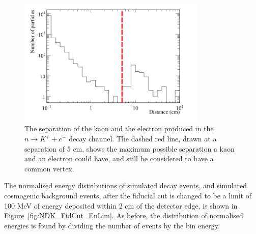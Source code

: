 \begin{figure}[h!]
  \centering
  \includegraphics[width=0.8\textwidth]{NucleonDecay_KaonElecSep}
  \caption[The separation of the kaon and the electron produced in the $n \rightarrow K^{+} + e^{-}$ decay channel]
          {The separation of the kaon and the electron produced in the $n \rightarrow K^{+} + e^{-}$ decay channel. The dashed red line, drawn at a separation of 5 cm, shows the maximum possible separation a kaon and an electron could have, and still be considered to have a common vertex.}
  \label{fig:NDK_Sig_KEDist}
\end{figure}

The normalised energy distributions of simulated decay events, and simulated cosmogenic background events, after the fiducial cut is changed to be a limit of 100 MeV of energy deposited within 2 cm of the detector edge, is shown in Figure~\ref{fig:NDK_FidCut_EnLim}. As before, the distribution of normalised energies is found by dividing the number of events by the bin energy. \\

